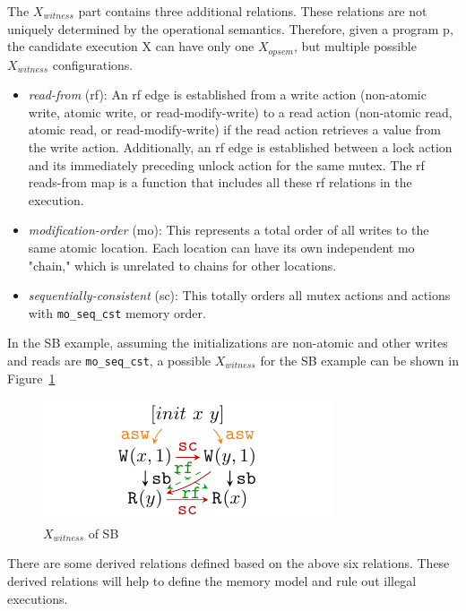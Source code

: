 The $X_{witness}$ part contains three additional relations. These relations are not uniquely determined by the operational semantics. Therefore, given a program p, the candidate execution X can have only one $X_{opsem}$, but multiple possible $X_{witness}$ configurations.


\begin{itemize}
	\item \textit{read-from} (rf): An rf edge is established from a write action (non-atomic write, atomic write, or read-modify-write) to a read action (non-atomic read, atomic read, or read-modify-write) if the read action retrieves a value from the write action. Additionally, an rf edge is established between a lock action and its immediately preceding unlock action for the same mutex. The rf reads-from map is a function that includes all these rf relations in the execution.
	\item \textit{modification-order} (mo): This represents a total order of all writes to the same atomic location. Each location can have its own independent mo "chain," which is unrelated to chains for other locations.
	\item \textit{sequentially-consistent} (sc): This totally orders all mutex actions and actions with \texttt{mo\_seq\_cst} memory order.
\end{itemize}


In the SB example, assuming the initializations are non-atomic and other writes and reads are \texttt{mo\_seq\_cst}, a possible $X_{witness}$ for the SB example can be shown in Figure~\ref{XwitnessSB}

\begin{figure}[htbp] %
	\centering
	\includegraphics[scale=1]{figure/exec-graph/SB2.pdf} %
	\caption{$X_{witness}$ of SB} %
	\label{XwitnessSB} %
\end{figure}

There are some derived relations defined based on the above six relations. These derived relations will help to define the memory model and rule out illegal executions.

